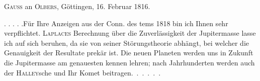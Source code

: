 \par{}\bigskip
\begin{center}
\textsc{Gauss} an \textsc{Olbers}, Göttingen, 16. Februar 1816.
\end{center}
\noindent\hspace*{\parindent}. . . . .\quad Für Ihre Anzeigen aus der Conn. des tems 1818 bin ich Ihnen sehr verpflichtet. \textsc{Laplaces} Berechnung über die Zuverlässigkeit der Jupitermasse lasse ich auf sich beruhen, da sie von seiner Störungstheorie abhängt, bei welcher die Genauigkeit der Resultate prekär ist. Die neuen Planeten werden uns in Zukunft die Jupitermasse am genauesten kennen lehren; nach Jahrhunderten werden auch der \textsc{Halley}sche und Ihr Komet beitragen.\quad\mbox{ . . . . .}
\par
